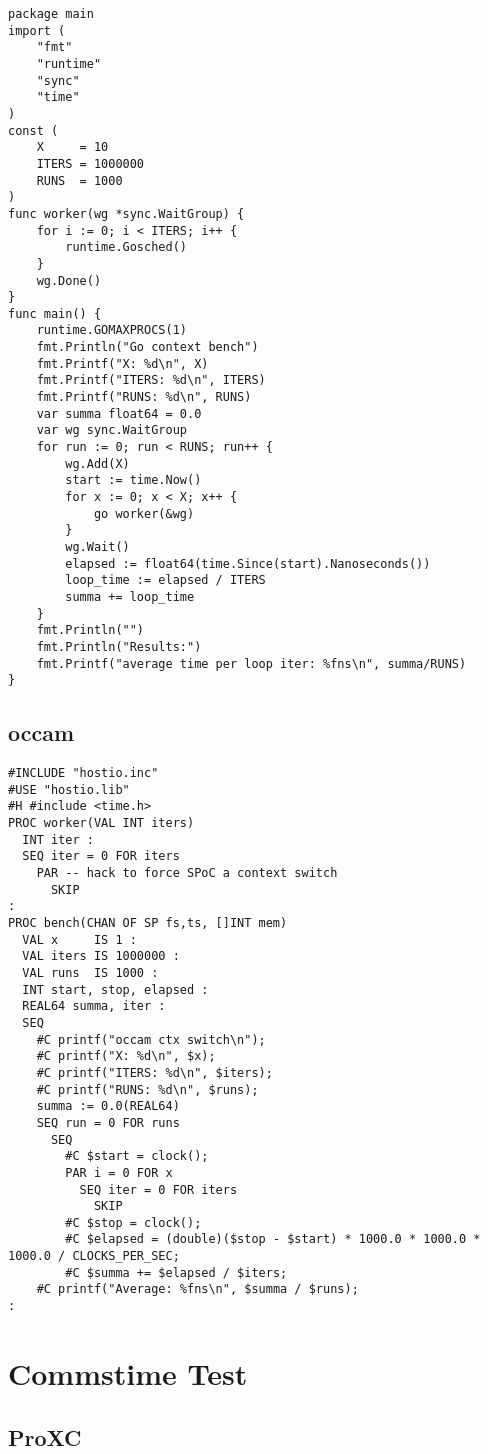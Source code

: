\begin{lstlisting}[caption={Context switch code for Go},style={CustomGo}]
package main
import (
	"fmt"
	"runtime"
	"sync"
	"time"
)
const (
	X     = 10
	ITERS = 1000000
	RUNS  = 1000
)
func worker(wg *sync.WaitGroup) {
	for i := 0; i < ITERS; i++ {
		runtime.Gosched()
	}
	wg.Done()
}
func main() {
	runtime.GOMAXPROCS(1)
	fmt.Println("Go context bench")
	fmt.Printf("X: %d\n", X)
	fmt.Printf("ITERS: %d\n", ITERS)
	fmt.Printf("RUNS: %d\n", RUNS)
	var summa float64 = 0.0
	var wg sync.WaitGroup
	for run := 0; run < RUNS; run++ {
		wg.Add(X)
		start := time.Now()
		for x := 0; x < X; x++ {
			go worker(&wg)
		}
		wg.Wait()
		elapsed := float64(time.Since(start).Nanoseconds())
		loop_time := elapsed / ITERS
		summa += loop_time
	}
	fmt.Println("")
	fmt.Println("Results:")
	fmt.Printf("average time per loop iter: %fns\n", summa/RUNS)
}
\end{lstlisting}

\subsection*{occam}

\begin{lstlisting}[caption={Context switch code for occam},style={CustomOccam}]
#INCLUDE "hostio.inc"
#USE "hostio.lib"
#H #include <time.h>
PROC worker(VAL INT iters)
  INT iter :
  SEQ iter = 0 FOR iters
    PAR -- hack to force SPoC a context switch
      SKIP
:
PROC bench(CHAN OF SP fs,ts, []INT mem)
  VAL x     IS 1 : 
  VAL iters IS 1000000 :
  VAL runs  IS 1000 :
  INT start, stop, elapsed :
  REAL64 summa, iter :
  SEQ
    #C printf("occam ctx switch\n");
    #C printf("X: %d\n", $x);
    #C printf("ITERS: %d\n", $iters);
    #C printf("RUNS: %d\n", $runs);
    summa := 0.0(REAL64)
    SEQ run = 0 FOR runs
      SEQ
        #C $start = clock();
        PAR i = 0 FOR x
          SEQ iter = 0 FOR iters
            SKIP
        #C $stop = clock();
        #C $elapsed = (double)($stop - $start) * 1000.0 * 1000.0 * 1000.0 / CLOCKS_PER_SEC;
        #C $summa += $elapsed / $iters;
    #C printf("Average: %fns\n", $summa / $runs);
:
\end{lstlisting}

\section*{Commstime Test}

\subsection*{ProXC}

